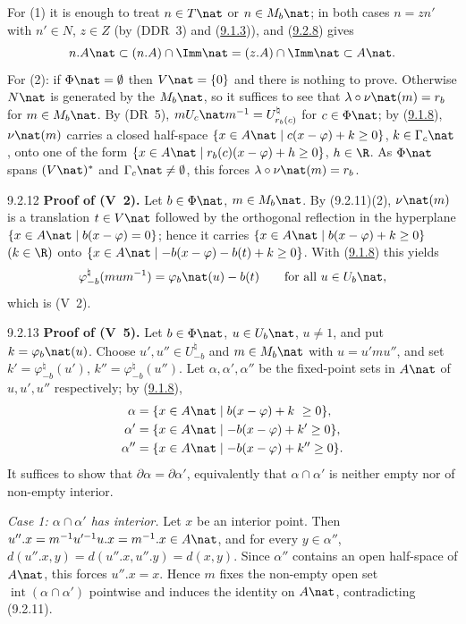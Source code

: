 \documentclass[12pt,a4paper,oneside,english]{smfart}
\makeatletter
\newcommand{\btanchor}[1]{\leavevmode\Hy@raisedlink{\hypertarget{bt:#1}{}}}
\newcommand{\btref}[1]{\hyperlink{bt:#1}{#1}}
\theoremstyle{definition}
\theoremstyle{bt}
\makeatother
\begin{document}
\pf For (1) it is enough to treat $n\in T\nat$ or $n\in M_b\nat$; in both cases
$n=zn'$ with $n'\in N$, $z\in Z$ (by (DDR~3) and (\btref{9.1.3})), and (\btref{9.2.8}) gives
\[
n.A\nat\subset (n.A)\cap\Imm\nat=(z.A)\cap\Imm\nat\subset A\nat .
\]
For (2): if $\Phi\nat=\emptyset$ then $V\nat=\{0\}$ and there is nothing to
prove. Otherwise $N\nat$ is generated by the $M_b\nat$, so it suffices to see
that $\lambda\circ\nu\nat(m)=r_b$ for $m\in M_b\nat$. By (DR~5),
$mU_c\nat m^{-1}=U^{\natural}_{r_b(c)}$ for $c\in\Phi\nat$; by (\btref{9.1.8}),
$\nu\nat(m)$ carries a closed half-space
$\{x\in A\nat\mid c(x-\varphi)+k\ge 0\}$, $k\in\Gamma_c\nat$, onto one of the
form $\{x\in A\nat\mid r_b(c)(x-\varphi)+h\ge 0\}$, $h\in\R$. As $\Phi\nat$
spans $(V\nat)^{*}$ and $\Gamma_c\nat\neq\emptyset$, this forces
$\lambda\circ\nu\nat(m)=r_b$.

\num{9.2.12}\btanchor{9.2.12} \textbf{Proof of (V~2).}
Let $b\in\Phi\nat$, $m\in M_b\nat$. By (9.2.11)(2), $\nu\nat(m)$ is a
translation $t\in V\nat$ followed by the orthogonal reflection in the hyperplane
$\{x\in A\nat\mid b(x-\varphi)=0\}$; hence it carries
$\{x\in A\nat\mid b(x-\varphi)+k\ge 0\}$ $(k\in\R)$ onto
$\{x\in A\nat\mid -b(x-\varphi)-b(t)+k\ge 0\}$. With (\btref{9.1.8}) this yields
\[
\varphi^{\natural}_{-b}(mum^{-1})=\varphi_b\nat(u)-b(t)
\qquad\text{for all } u\in U_b\nat,
\]
which is (V~2).

\num{9.2.13}\btanchor{9.2.13} \textbf{Proof of (V~5).}
Let $b\in\Phi\nat$, $u\in U_b\nat$, $u\neq 1$, and put $k=\varphi_b\nat(u)$.
Choose $u',u''\in U^{\natural}_{-b}$ and $m\in M_b\nat$ with $u=u'mu''$, and set
$k'=\varphi^{\natural}_{-b}(u')$, $k''=\varphi^{\natural}_{-b}(u'')$. Let
$\alpha,\alpha',\alpha''$ be the fixed-point sets in $A\nat$ of $u,u',u''$
respectively; by (\btref{9.1.8}),
\begin{align*}
\alpha  &=\{x\in A\nat\mid  b(x-\varphi)+k\ \ge 0\},\\
\alpha' &=\{x\in A\nat\mid -b(x-\varphi)+k'\ge 0\},\\
\alpha''&=\{x\in A\nat\mid -b(x-\varphi)+k''\ge 0\}.
\end{align*}
It suffices to show that $\partial\alpha=\partial\alpha'$, equivalently that
$\alpha\cap\alpha'$ is neither empty nor of non-empty interior.

\smallskip
\emph{Case 1: $\alpha\cap\alpha'$ has interior.} Let $x$ be an interior point.
Then $u''.x=m^{-1}u'^{-1}u.x=m^{-1}.x\in A\nat$, and for every $y\in\alpha''$,
$d(u''.x,y)=d(u''.x,u''.y)=d(x,y)$. Since $\alpha''$ contains an open half-space
of $A\nat$, this forces $u''.x=x$. Hence $m$ fixes the non-empty open set
$\operatorname{int}(\alpha\cap\alpha')$ pointwise and induces the identity on
$A\nat$, contradicting (9.2.11).
\end{document}
